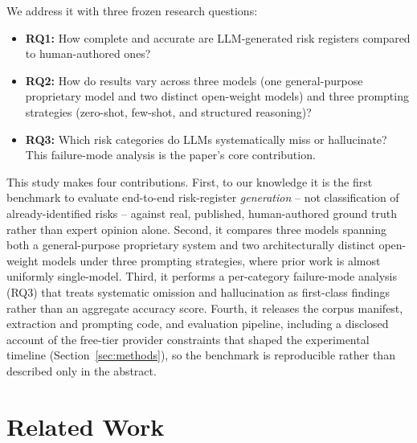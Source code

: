 \documentclass[conference]{IEEEtran}
\begin{document}
We address it with three frozen research questions:

\begin{itemize}
\item \textbf{RQ1:} How complete and accurate are LLM-generated risk
  registers compared to human-authored ones?
\item \textbf{RQ2:} How do results vary across three models (one
  general-purpose proprietary model and two distinct open-weight models)
  and three prompting strategies (zero-shot, few-shot, and structured
  reasoning)?
\item \textbf{RQ3:} Which risk categories do LLMs systematically miss or
  hallucinate? This failure-mode analysis is the paper's core contribution.
\end{itemize}

This study makes four contributions. First, to our knowledge it is the
first benchmark to evaluate end-to-end risk-register \emph{generation} --
not classification of already-identified risks -- against real, published,
human-authored ground truth rather than expert opinion alone. Second, it
compares three models spanning both a general-purpose proprietary system
and two architecturally distinct open-weight models under three prompting
strategies, where prior work is almost uniformly single-model. Third, it
performs a per-category failure-mode analysis (RQ3) that treats systematic
omission and hallucination as first-class findings rather than an aggregate
accuracy score. Fourth, it releases the corpus manifest, extraction and
prompting code, and evaluation pipeline, including a disclosed account of
the free-tier provider constraints that shaped the experimental timeline
(Section~\ref{sec:methods}), so the benchmark is reproducible rather than
described only in the abstract.

\section{Related Work}
\label{sec:related}
\end{document}
